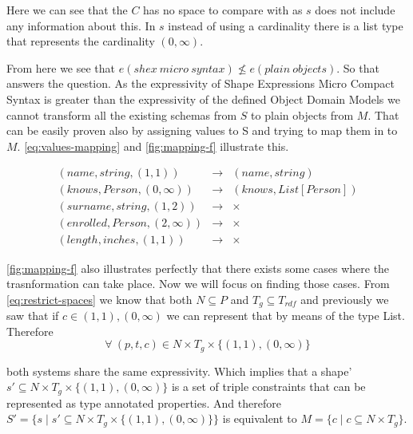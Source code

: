 Here we can see that the $C$ has no space to compare with as $s$ does not include any information about this.
In $s$ instead of using a cardinality there is a list type that represents the cardinality $(0, \infty)$.

From here we see that $e(shex\ micro\ syntax) \not\leq e(plain\ objects)$. So that answers the question.
As the expressivity of Shape Expressions Micro Compact Syntax is greater than the expressivity of the
defined Object Domain Models we cannot transform all the existing schemas from $S$ to plain objects from $M$.
That can be easily proven also by assigning values to S and trying to map them in to $M$. \cref{eq:values-mapping}
and \cref{fig:mapping-f} illustrate this.

\begin{equation}\label{eq:values-mapping}
    \begin{aligned}
(name,string,(1,1)) & \rightarrow & (name,string)\\
(knows,Person,(0,\infty)) & \rightarrow & (knows,List[Person])\\
(surname,string,(1,2)) & \rightarrow & \times \\
(enrolled,Person,(2,\infty)) & \rightarrow & \times \\
(length,inches,(1,1)) & \rightarrow & \times  
    \end{aligned}
\end{equation}

\cref{fig:mapping-f} also illustrates perfectly that there exists some cases where the trasnformation can take
place. Now we will focus on finding those cases. From \cref{eq:restrict-spaces} we know that both $N \subseteq P$
and $T_g \subseteq T_{rdf}$ and previously we saw that if $c \in {(1,1), (0,\infty)}$ we can represent that by means
of the type List. Therefore
\begin{equation}\label{eq:restriction}
    \forall\ (p,t,c) \in N \times T_g \times \{(1,1),(0,\infty)\}   
\end{equation}

both systems share the same expressivity. Which implies that a shape' $s' \subseteq N \times T_g \times \{(1,1),(0,\infty)\}$
is a set of triple constraints that can be represented as type annotated properties. And therefore
$S'=\{s \mid s' \subseteq N \times T_g \times \{(1,1),(0,\infty)\} \}$ is equivalent to $M = \{ c \mid c \subseteq N \times T_{g} \}$.